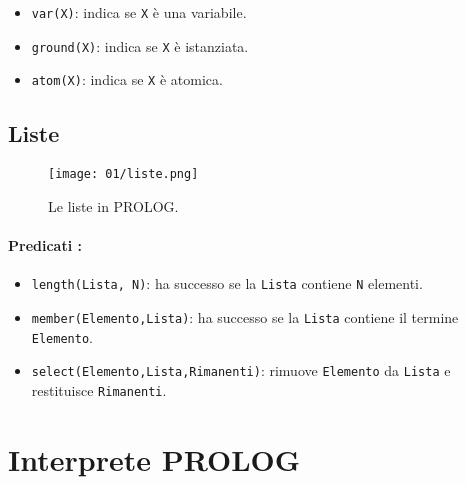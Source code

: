 \begin{itemize}
  \item \texttt{var(X)}: indica se \texttt{X} è una variabile. 
\item \texttt{ground(X)}: indica se \texttt{X} è istanziata. 
\item \texttt{atom(X)}: indica se \texttt{X} è atomica. 
\end{itemize}

\subsection{Liste}



\begin{figure}[h]
    \centering
    \texttt{[image: 01/liste.png]}
    \caption{Le liste in PROLOG.}
\end{figure}

\paragraph{Predicati :}

\begin{itemize}
  \item \texttt{length(Lista, N)}: ha successo se la \texttt{Lista} contiene \texttt{N} elementi. 
  \item \texttt{member(Elemento,Lista)}: ha successo se la \texttt{Lista} contiene il termine \texttt{Elemento}.
  \item \texttt{select(Elemento,Lista,Rimanenti)}: rimuove \texttt{Elemento} da \texttt{Lista} e restituisce \texttt{Rimanenti}. 
\end{itemize}

\section{Interprete PROLOG}


